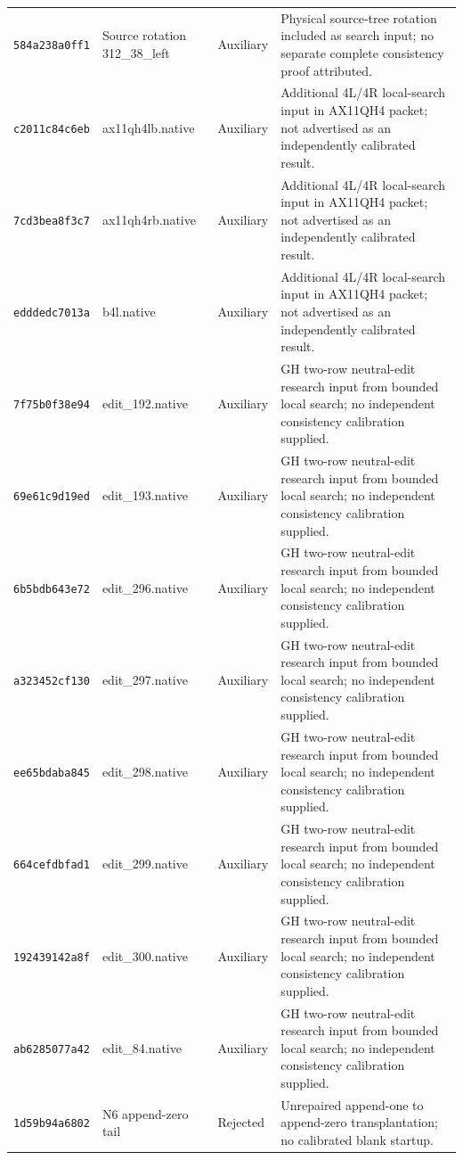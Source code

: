 {\begin{longtable}{@{}>{\raggedright\arraybackslash}p{}>{\raggedright\arraybackslash}p{}>{\raggedright\arraybackslash}p{}>{\raggedright\arraybackslash}p{}@{}}
\texttt{584a238a0ff1} & Source rotation 312\_38\_left & Auxiliary & Physical source-tree rotation included as search input; no separate complete consistency proof attributed.\\[3pt]
\texttt{c2011c84c6eb} & ax11qh4lb.native & Auxiliary & Additional 4L/4R local-search input in AX11QH4 packet; not advertised as an independently calibrated result.\\[3pt]
\texttt{7cd3bea8f3c7} & ax11qh4rb.native & Auxiliary & Additional 4L/4R local-search input in AX11QH4 packet; not advertised as an independently calibrated result.\\[3pt]
\texttt{edddedc7013a} & b4l.native & Auxiliary & Additional 4L/4R local-search input in AX11QH4 packet; not advertised as an independently calibrated result.\\[3pt]
\texttt{7f75b0f38e94} & edit\_192.native & Auxiliary & GH two-row neutral-edit research input from bounded local search; no independent consistency calibration supplied.\\[3pt]
\texttt{69e61c9d19ed} & edit\_193.native & Auxiliary & GH two-row neutral-edit research input from bounded local search; no independent consistency calibration supplied.\\[3pt]
\texttt{6b5bdb643e72} & edit\_296.native & Auxiliary & GH two-row neutral-edit research input from bounded local search; no independent consistency calibration supplied.\\[3pt]
\texttt{a323452cf130} & edit\_297.native & Auxiliary & GH two-row neutral-edit research input from bounded local search; no independent consistency calibration supplied.\\[3pt]
\texttt{ee65bdaba845} & edit\_298.native & Auxiliary & GH two-row neutral-edit research input from bounded local search; no independent consistency calibration supplied.\\[3pt]
\texttt{664cefdbfad1} & edit\_299.native & Auxiliary & GH two-row neutral-edit research input from bounded local search; no independent consistency calibration supplied.\\[3pt]
\texttt{192439142a8f} & edit\_300.native & Auxiliary & GH two-row neutral-edit research input from bounded local search; no independent consistency calibration supplied.\\[3pt]
\texttt{ab6285077a42} & edit\_84.native & Auxiliary & GH two-row neutral-edit research input from bounded local search; no independent consistency calibration supplied.\\[3pt]
\texttt{1d59b94a6802} & N6 append-zero tail & Rejected & Unrepaired append-one to append-zero transplantation; no calibrated blank startup.\\[3pt]

\end{longtable}}
